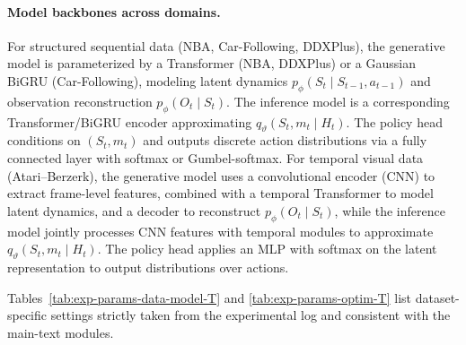 \documentclass{article} %
\begin{document}
\paragraph{Model backbones across domains.}
For structured sequential data (NBA, Car-Following, DDXPlus), the generative model is parameterized
by a Transformer (NBA, DDXPlus) or a Gaussian BiGRU (Car-Following), modeling latent dynamics
$p_\phi(S_t\!\mid\!S_{t-1},a_{t-1})$ and observation reconstruction $p_\phi(O_t\!\mid\!S_t)$.
The inference model is a corresponding Transformer/BiGRU encoder approximating
$q_\vartheta(S_t,m_t\!\mid\!H_t)$.
The policy head conditions on $(S_t,m_t)$ and outputs discrete action distributions via a fully
connected layer with softmax or Gumbel-softmax.
For temporal visual data (Atari--Berzerk), the generative model uses a convolutional encoder (CNN)
to extract frame-level features, combined with a temporal Transformer to model latent dynamics, and
a decoder to reconstruct $p_\phi(O_t\!\mid\!S_t)$, while the inference model jointly processes CNN
features with temporal modules to approximate $q_\vartheta(S_t,m_t\!\mid\!H_t)$. The policy head
applies an MLP with softmax on the latent representation to output distributions over actions.


Tables~\ref{tab:exp-params-data-model-T} and \ref{tab:exp-params-optim-T} list dataset-specific settings strictly taken from the experimental log and consistent with the main-text modules.
\end{document}
